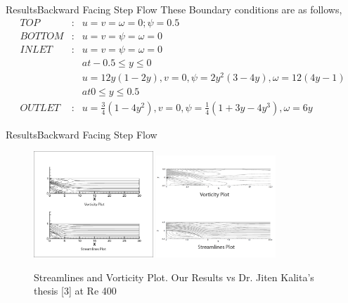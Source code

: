 \documentclass[11pt]{beamer}
\begin{document}
\begin{frame}{Results}{Backward Facing Step Flow}
These Boundary conditions are as follows,
\begin{eqnarray}
TOP &:& u = v = \omega = 0; \psi =0.5 \nonumber\\
BOTTOM &:& u = v = \psi = \omega= 0 \nonumber\\
INLET &:&  u = v = \psi = \omega= 0  \hspace{1cm} \nonumber\\
&& at -0.5 \leq y \leq 0 \nonumber\\
&& u=12y(1-2y), v=0, \psi = 2y^{2}(3-4y), \omega = 12(4y-1) \nonumber\\
&& at 0 \leq y \leq 0.5 \nonumber\\
OUTLET &:& u=\frac{3}{4}(1-4y^{2}), v=0, \psi = \frac{1}{4}(1+3y-4y^{3}), \omega = 6y \nonumber
\end{eqnarray}
\end{frame}

\begin{frame}{Results}{Backward Facing Step Flow}
\begin{figure}[hH]
\includegraphics[width=0.40\textwidth]{images/l30l/our400}
\includegraphics[width=0.40\textwidth]{images/l30l/sir400}
\caption{Streamlines and Vorticity Plot. Our Results vs Dr. Jiten Kalita's thesis [3] at Re 400}
\end{figure}
\end{frame}
\end{document}
